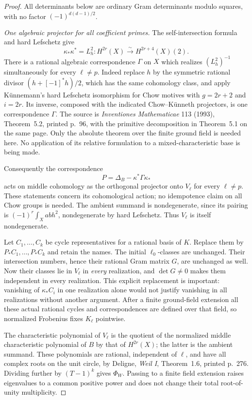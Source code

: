\documentclass[11pt]{article}
\theoremstyle{remark}\newtheorem{remark}[theorem]{Remark}
\begin{document}
\begin{proof}
All determinants below are ordinary Gram determinants modulo
squares, with no factor $(-1)^{d(d-1)/2}$.

\emph{One algebraic projector for all coefficient primes.}
The self-intersection formula and hard Lefschetz give
\[
 \kappa_*\kappa^*=L_h^2:
       H^{2r}(X)\xrightarrow{\sim}H^{2r+4}(X)(2).
 \tag{A15.4}
\]
There is a rational algebraic correspondence $\Gamma$ on $X$
which realizes $(L_h^2)^{-1}$ simultaneously for every $\ell\ne p$.
Indeed replace $h$ by the symmetric rational divisor
$(h+[-1]^*h)/2$, which has the same cohomology class, and apply
K\"unnemann's hard Lefschetz isomorphism for Chow motives with
$g=2r+2$ and $i=2r$. Its inverse, composed with the indicated
Chow--K\"unneth projectors, is one correspondence $\Gamma$.
The source is \emph{Inventiones Mathematicae} 113 (1993),
Theorem~5.2, printed p.~96, with the primitive decomposition
in Theorem~5.1 on the same page. Only the absolute theorem over
the finite ground field is needed here. No application of its
relative formulation to a mixed-characteristic base is being made.

Consequently the correspondence
\[
                 P=\Delta_B-\kappa^*\Gamma\kappa_*
 \tag{A15.5}
\]
acts on middle cohomology as the orthogonal projector onto
$V_\ell$ for every $\ell\ne p$. These statements concern its
cohomological action; no idempotence claim on all Chow groups
is needed. The ambient summand is nondegenerate, since its
pairing is $(-1)^r\int_X ab h^2$, nondegenerate by hard
Lefschetz. Thus $V_\ell$ is itself nondegenerate.

Let $C_1,\ldots,C_k$ be cycle representatives for a rational
basis of $K$. Replace them by $P_*C_1,\ldots,P_*C_k$ and retain
the names. The initial $\ell_0$-classes are unchanged. Their
intersection numbers, hence their rational Gram matrix $G$,
are unchanged as well. Now their classes lie in $V_\ell$ in
\emph{every} realization, and $\det G\ne0$ makes them independent
in every realization. This explicit replacement is important:
vanishing of $\kappa_*C_i$ in one realization alone would not
justify vanishing in all realizations without another argument.
After a finite ground-field extension all these actual rational
cycles and correspondences are defined over that field, so
normalized Frobenius fixes $K_\ell$ pointwise.

The characteristic polynomial of $V_\ell$ is the quotient of
the normalized middle characteristic polynomial of $B$ by that
of $H^{2r}(X)$; the latter is the ambient summand. These
polynomials are rational, independent of $\ell$, and have all
complex roots on the unit circle, by Deligne, \emph{Weil I},
Theorem~1.6, printed p.~276. Dividing further by $(T-1)^k$
gives $\Phi_W$. Passing to a finite field extension raises
eigenvalues to a common positive power and does not change
their total root-of-unity multiplicity.


\end{proof}
\end{document}
